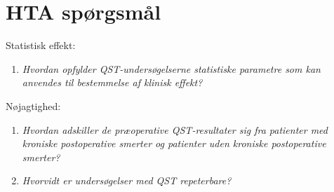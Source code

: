 \section{HTA spørgsmål}
Statistisk effekt:
\begin{enumerate}
	\item \textit{Hvordan opfylder QST-undersøgelserne statistiske parametre som kan anvendes til bestemmelse af klinisk effekt?} %
\end{enumerate}
Nøjagtighed:
\begin{enumerate}[resume]
	\item \textit{Hvordan adskiller de præoperative QST-resultater sig fra patienter med kroniske postoperative smerter og patienter uden kroniske postoperative smerter?} %
	\item \textit{Hvorvidt er undersøgelser med QST repeterbare?} 
\end{enumerate}

